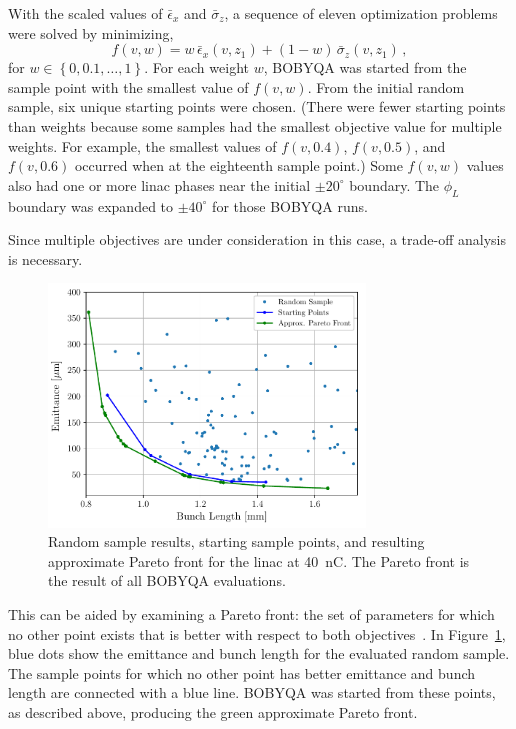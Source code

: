 With the scaled values of $\bar{\epsilon}_x$ and $\bar{\sigma}_z$, a sequence
of eleven optimization problems were solved by minimizing,
\begin{equation}
f(v,w) = w \,\bar{\epsilon}_x(v,z_1) + (1-w)\, \bar{\sigma}_z(v,z_1)\, ,
\label{eq:newobj}
\end{equation}
for $w \in \left\{ 0, 0.1, \ldots, 1 \right\}$. 
For each weight $w$, BOBYQA was started from the sample point with the 
smallest value of $f(v,w)$.  From the initial random sample, six unique starting points were chosen. 
(There were fewer starting points than weights because some samples had the smallest objective value for multiple weights. 
For example, the smallest values of $f(v,0.4)$, $f(v,0.5)$, and $f(v,0.6)$ occurred when at the eighteenth sample point.)
Some $f(v,w)$ values also had one or more linac phases near the initial $\pm20^{\circ}$ boundary. 
The $\phi_L$ boundary was expanded to $\pm40^{\circ}$ for those BOBYQA runs.

Since multiple objectives are under consideration in this case, a
trade-off analysis is necessary. 
\begin{figure}%
	\begin{center}
		\includegraphics[width=0.75\textwidth]{images/THPAB155f1}
		\caption{Random sample results, starting sample points, and resulting approximate Pareto front for the linac at \SI{40}{nC}. The Pareto front is the result of all BOBYQA evaluations.}
		\label{fig:pareto}
	\end{center}
\end{figure}
This can be aided by examining a Pareto front: the set of parameters 
for which no other point exists that is better with respect to both objectives~\cite{ehrgott2006multicriteria}.
In Figure~\ref{fig:pareto}, blue dots show the emittance and bunch length for the
evaluated random sample. The sample points for which no other point has better
emittance and bunch length are connected with a blue line. BOBYQA was started
from these points, as described above, producing the green approximate Pareto front. 

